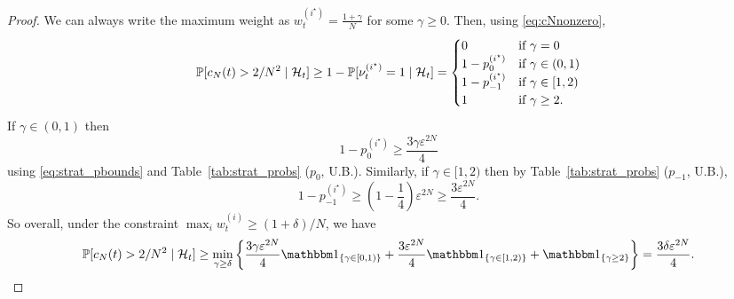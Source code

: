 \begin{proof}
We can always write the maximum weight as $w_t^{(i^\star)} = \frac{1+\gamma}{N}$ for some $\gamma \geq 0$. Then, using \eqref{eq:cNnonzero},
\begin{equation*}
\mathbb{P}[ c_N(t) > 2/N^2 \mid \mathcal{H}_t ]
\geq 1- \mathbb{P}[ \nu_t^{(i^\star)} =1 \mid \mathcal{H}_t ]
= \begin{cases}
    0 & \text{if } \gamma = 0 \\
    1 - p_0^{(i^\star)} & \text{if } \gamma \in (0,1) \\
    1 - p_{-1}^{(i^\star)} & \text{if } \gamma \in [1,2) \\
    1 & \text{if } \gamma \geq 2 .
\end{cases}
\end{equation*}
If $\gamma \in (0,1)$ then
\begin{equation*}
1 - p_0^{(i^\star)}
\geq \frac{3\gamma \varepsilon^{2N} }{4}
\end{equation*}
using \eqref{eq:strat_pbounds} and %
Table~\ref{tab:strat_probs} ($p_0$, U.B.).
Similarly, if $\gamma \in [1,2)$ then by Table~\ref{tab:strat_probs} ($p_{-1}$, U.B.),
\begin{equation*}
1 - p_{-1}^{(i^\star)}
\geq \left( 1- \frac{1}{4} \right)
        \varepsilon^{2N} 
\geq \frac{3 \varepsilon^{2N} }{4} .
\end{equation*}
So overall, under the constraint $\max_i w_t^{(i)} \geq (1+\delta)/N$, we have
\begin{equation*}
\Prob[ c_N(t) > 2/N^2 \mid \mathcal{H}_t ]
\geq \min_{\gamma \geq \delta} 
        \left\{ \frac{3\gamma \varepsilon^{2N} }{4}\I{\gamma \in [0,1)}
        + \frac{3 \varepsilon^{2N} }{4}\I{\gamma \in [1,2)}
        + \I{\gamma \geq 2} \right\}
= \frac{ 3\delta \varepsilon^{2N} }{4} .
\end{equation*}


\end{proof}
